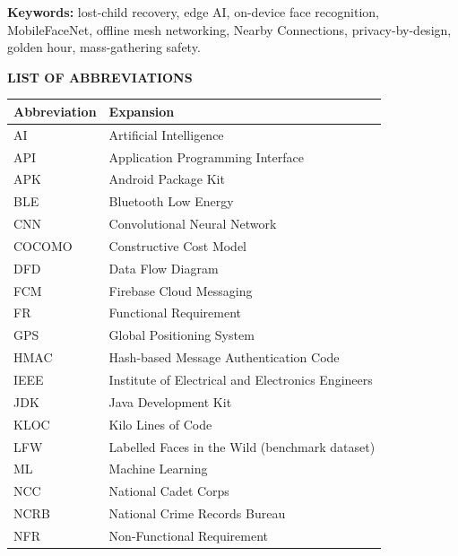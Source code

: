 \documentclass[12pt,a4paper,oneside]{report}
\begin{document}
\vspace{0.6cm}
\noindent\textbf{Keywords:} lost-child recovery, edge AI, on-device face
recognition, MobileFaceNet, offline mesh networking, Nearby Connections,
privacy-by-design, golden hour, mass-gathering safety.

\newpage
\tableofcontents
\newpage
\listoffigures
\newpage
\listoftables

\newpage
\thispagestyle{plain}
\begin{center}
{\Large\bfseries LIST OF ABBREVIATIONS}
\end{center}
\vspace{0.4cm}
\begin{longtable}{|p{3.2cm}|p{11cm}|}
\hline
\textbf{Abbreviation} & \textbf{Expansion} \\
\hline
\endhead
AI    & Artificial Intelligence \\ \hline
API   & Application Programming Interface \\ \hline
APK   & Android Package Kit \\ \hline
BLE   & Bluetooth Low Energy \\ \hline
CNN   & Convolutional Neural Network \\ \hline
COCOMO & Constructive Cost Model \\ \hline
DFD   & Data Flow Diagram \\ \hline
FCM   & Firebase Cloud Messaging \\ \hline
FR    & Functional Requirement \\ \hline
GPS   & Global Positioning System \\ \hline
HMAC  & Hash-based Message Authentication Code \\ \hline
IEEE  & Institute of Electrical and Electronics Engineers \\ \hline
JDK   & Java Development Kit \\ \hline
KLOC  & Kilo Lines of Code \\ \hline
LFW   & Labelled Faces in the Wild (benchmark dataset) \\ \hline
ML    & Machine Learning \\ \hline
NCC   & National Cadet Corps \\ \hline
NCRB  & National Crime Records Bureau \\ \hline
NFR   & Non-Functional Requirement \\ \hline

\end{longtable}
\end{document}
